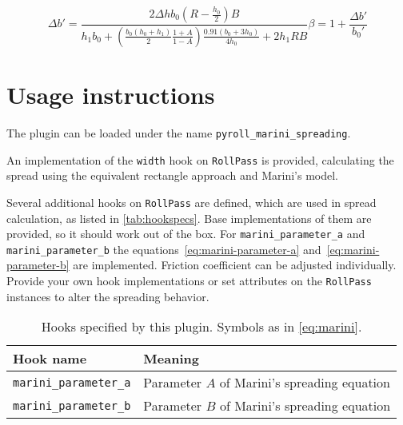 \documentclass[11pt]{PyRollDocs}
\begin{document}
    \begin{subequations}
        \begin{equation}
            \Delta b' = \frac{2 \Delta h b_0 \left( R - \frac{h_0}{2} \right) B }{h_1 b_0 + \left( \frac{b_0 \left( h_0 + h_1 \right)}{2} \frac{1 + A}{1 - A} \right) \frac{0.91 \left( b_0 + 3 h_0 \right)}{4 h_0} + 2 h_1 R B}
            \label{eq:delta-b}
        \end{equation}
        \begin{equation}
        \beta = 1 + \frac{\Delta b'}{b_0'}
        \label{eq:spread-reformulated}
    \end{equation}
    \end{subequations}


    \section{Usage instructions}\label{sec:usage-instructions}

    The plugin can be loaded under the name \texttt{pyroll\_marini\_spreading}.

    An implementation of the \lstinline{width} hook on \lstinline{RollPass} is provided,
    calculating the spread using the equivalent rectangle approach and Marini's model.

    Several additional hooks on \lstinline{RollPass} are defined, which are used in spread calculation, as listed in \autoref{tab:hookspecs}.
    Base implementations of them are provided, so it should work out of the box.
    For \lstinline{marini_parameter_a} and \lstinline{marini_parameter_b} the equations~\ref{eq:marini-parameter-a} and~\ref{eq:marini-parameter-b} are implemented.
    Friction coefficient can be adjusted individually.
    Provide your own hook implementations or set attributes on the \lstinline{RollPass} instances to alter the spreading behavior.

    \begin{table}
        \centering
        \caption{Hooks specified by this plugin. Symbols as in \autoref{eq:marini}.}
        \label{tab:hookspecs}
        \begin{tabular}{ll}
            \toprule
            Hook name                     & Meaning                                      \\
            \midrule
            \texttt{marini\_parameter\_a}   & Parameter $A$ of Marini's spreading equation \\
            \texttt{marini\_parameter\_b}   & Parameter $B$ of Marini's spreading equation \\
            \bottomrule
        \end{tabular}
    \end{table}

    \printbibliography
\end{document}
